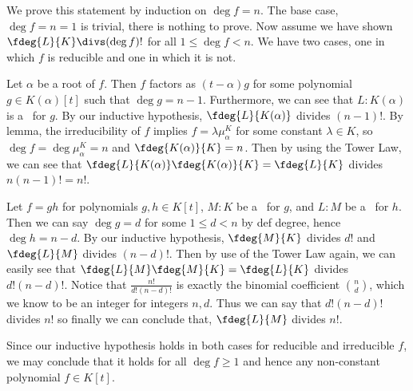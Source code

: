 \documentclass{article}
\begin{document}
\begin{solution}
We prove this statement by induction on \( \deg f = n \).
The base case, \( \deg f = n = 1 \) is trivial, there is nothing to prove.
Now assume we have shown \( \fdeg{L}{K}\divs (\deg f)! \) for all \( 1\leq\deg f<n \).
We have two cases, one in which \( f \) is reducible and one in which it is not.
\begin{subproof}
Let \( \alpha \) be a root of \( f \).
Then \( f \) factors as \( (t-\alpha)g \) for some polynomial \( g\in K(\alpha)[t] \) such that \( \deg g = n-1 \).
Furthermore, we can see that \( L:K(\alpha) \) is a \sfe~for \( g \).
By our inductive hypothesis, \( \fdeg{L}{K(\alpha)} \) divides \( (n-1)! \).
By lemma, the irreducibility of \( f \) implies \( f=\lambda\mu_\alpha^{K} \) for some constant \( \lambda\in K \), so \( \deg f = \deg \mu_\alpha^K = n \) and \( \fdeg{K(\alpha)}{K}=n \).
Then by using the Tower Law, we can see that \( \fdeg{L}{K(\alpha)}\fdeg{K(\alpha)}{K} = \fdeg{L}{K} \) divides \( n(n-1)! = n! \).
\end{subproof}
\begin{subproof}
  Let \( f = gh \) for polynomials \( g,h\in K[t] \),  \( M:K \) be a \sfe~for \( g \), and \( L:M \) be a \sfe~for \( h \).
  Then we can say \( \deg g = d \) for some \( 1\leq d < n \) by def degree, hence \( \deg h = n-d \).
  By our inductive hypothesis, \( \fdeg{M}{K} \) divides \( d! \) and \( \fdeg{L}{M} \) divides \( (n-d)! \).
  Then by use of the Tower Law again, we can easily see that \( \fdeg{L}{M}\fdeg{M}{K} = \fdeg{L}{K} \) divides \( d!(n-d)! \).
  Notice that \( \frac{n!}{d!(n-d)!} \) is exactly the binomial coefficient \( \binom{n}{d} \), which we know to be an integer for integers \( n,d \).
  Thus we can say that \( d!(n-d)! \) divides \( n! \) so finally we can conclude that, \( \fdeg{L}{M} \) divides \( n! \).
\end{subproof}
Since our inductive hypothesis holds in both cases for reducible and irreducible \( f \), we may conclude that it holds for all \( \deg f \geq 1 \) and hence any non-constant polynomial \( f\in K[t] \).
\end{solution}
\end{document}
